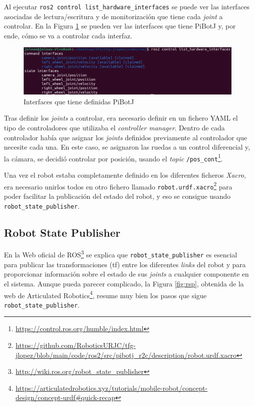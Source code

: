 Al ejecutar \verb|ros2 control list_hardware_interfaces| se puede ver las interfaces asociadas de lectura/escritura y de monitorización que tiene cada \textit{joint} a controlar. En la Figura \ref{fig:ros2control} se pueden ver las interfaces que tiene PiBotJ y, por ende, cómo se va a controlar cada interfaz.

 \begin{figure} [h!]
 	\begin{center}
 		\includegraphics[width=14cm]{figs/cap6/interfaces.png}
 	\end{center}
 	\caption{Interfaces que tiene definidas PiBotJ}
 	\label{fig:ros2control}
 \end{figure}

Tras definir los \textit{joints} a controlar, era necesario definir en un fichero YAML el tipo de controladores que utilizaba el \textit{controller manager}. Dentro de cada controlador había que asignar los \textit{joints} definidos previamente al controlador que necesite cada una. En este caso, se asignaron las ruedas a un control diferencial y, la cámara, se decidió controlar por posición, usando el \textit{topic} \verb|/pos_cont|\footnote{\url{https://control.ros.org/humble/index.html}}.

Una vez el robot estaba completamente definido en los diferentes ficheros \textit{Xacro}, era necesario unirlos todos en otro fichero llamado \verb|robot.urdf.xacro|\footnote{\url{https://github.com/RoboticsURJC/tfg-jlopez/blob/main/code/ros2/src/pibotj_r2c/description/robot.urdf.xacro}} para poder facilitar la publicación del estado del robot, y eso se consigue usando \verb|robot_state_publisher|.
 
\subsection{Robot State Publisher}
\label{subsec:robotstatepublisher}

En la Web oficial de ROS\footnote{\url{http://wiki.ros.org/robot_state_publisher}} se explica que \verb|robot_state_publisher| es esencial para publicar las transformaciones (tf) entre los diferentes \textit{links} del robot y para proporcionar información sobre el estado de sus \textit{joints} a cualquier componente en el sistema. Aunque pueda parecer complicado, la Figura \ref{fig:rsp}, obtenida de la web de Articulated Robotics\footnote{\url{https://articulatedrobotics.xyz/tutorials/mobile-robot/concept-design/concept-urdf\#quick-recap}}, resume muy bien los pasos que sigue \verb|robot_state_publisher|.

